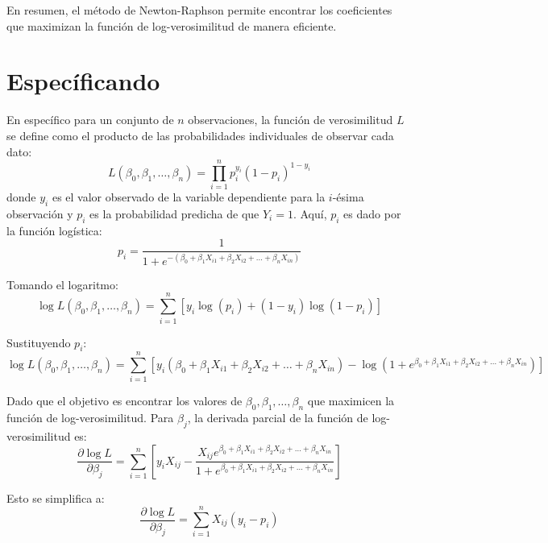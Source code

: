 En resumen, el método de Newton-Raphson permite encontrar los coeficientes que maximizan la función de log-verosimilitud de manera eficiente. 

\section{Espec\'ificando}
En espec\'ifico para un conjunto de $n$ observaciones, la función de verosimilitud $L$ se define como el producto de las probabilidades individuales de observar cada dato:
\begin{equation}
L(\beta_0, \beta_1, \ldots, \beta_n) = \prod_{i=1}^{n} p_i^{y_i} (1 - p_i)^{1 - y_i}
\end{equation}
donde $y_i$ es el valor observado de la variable dependiente para la $i$-ésima observación y $p_i$ es la probabilidad predicha de que $Y_i = 1$. Aquí, $p_i$ es dado por la función logística:
\begin{equation}
p_i = \frac{1}{1 + e^{-(\beta_0 + \beta_1 X_{i1} + \beta_2 X_{i2} + \ldots + \beta_n X_{in})}}
\end{equation}

Tomando el logaritmo:
\begin{equation}
\log L(\beta_0, \beta_1, \ldots, \beta_n) = \sum_{i=1}^{n} \left[ y_i \log(p_i) + (1 - y_i) \log(1 - p_i) \right]
\end{equation}

Sustituyendo $p_i$:
\begin{equation}
\log L(\beta_0, \beta_1, \ldots, \beta_n) = \sum_{i=1}^{n} \left[ y_i (\beta_0 + \beta_1 X_{i1} + \beta_2 X_{i2} + \ldots + \beta_n X_{in}) - \log(1 + e^{\beta_0 + \beta_1 X_{i1} + \beta_2 X_{i2} + \ldots + \beta_n X_{in}}) \right]
\end{equation}

Dado que el objetivo es encontrar los valores de $\beta_0, \beta_1, \ldots, \beta_n$ que maximicen la función de log-verosimilitud.  Para $\beta_j$, la derivada parcial de la función de log-verosimilitud es:
\begin{equation}
\frac{\partial \log L}{\partial \beta_j} = \sum_{i=1}^{n} \left[ y_i X_{ij} - \frac{X_{ij} e^{\beta_0 + \beta_1 X_{i1} + \beta_2 X_{i2} + \ldots + \beta_n X_{in}}}{1 + e^{\beta_0 + \beta_1 X_{i1} + \beta_2 X_{i2} + \ldots + \beta_n X_{in}}} \right]
\end{equation}

Esto se simplifica a:
\begin{equation}
\frac{\partial \log L}{\partial \beta_j} = \sum_{i=1}^{n} X_{ij} (y_i - p_i)
\end{equation}

